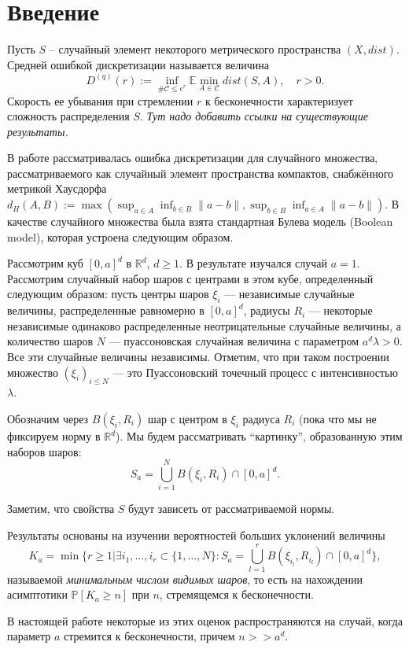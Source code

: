 \documentclass[12pt]{article}
\theoremstyle{plain}
\theoremstyle{definition}
\theoremstyle{remark}
\def\geq{\geqslant}
\def\leq{\leqslant}
\newcommand{\cuplim}{\bigcup\limits}
\newcommand{\R}{\mathbb{R}}
\newcommand{\PP}{\mathbb{P}}
\newcommand{\E}{\mathbb{E}}
\begin{document}
\section{Введение}

Пусть $S$  --  случайный элемент некоторого метрического пространства $(X, dist)$.
Средней ошибкой дискретизации называется величина $$D^{(q)}(r) := \inf\limits_{\#\mathcal{C}\leq e^r}\E \min\limits_{A\in\mathcal{C}}dist(S, A), \quad r>0.$$
Скорость ее убывания при  стремлении $r$ к бесконечности характеризует сложность распределения $S$.
{\it Тут надо добавить ссылки на существующие результаты.}

В работе \cite{AL} рассматривалась ошибка дискретизации для случайного множества,
рассматриваемого как случайный элемент пространства компактов, снабжённого метрикой Хаусдорфа $d_H(A, B) := \max(\sup_{a\in A}\inf_{b\in B}\|a - b\|, \sup_{b\in B}\inf_{a\in A}\|a - b\|)$.
В качестве случайного множества была взята стандартная Булева модель (Boolean model), которая
устроена следующим образом.

Рассмотрим куб $[0,a]^d$ в $\R^d$, $d \geq 1$. В результате \cite{AL} изучался случай $a=1$. Рассмотрим  случайный набор шаров с центрами в этом кубе, определенный следующим образом: пусть  центры шаров $\xi_i$ --- независимые случайные величины, распределенные равномерно в $[0,a]^d$, радиусы $R_i$ --- некоторые независимые одинаково распределенные неотрицательные случайные величины, а количество шаров $N$ --- пуассоновская случайная величина с параметром $a^d\lambda > 0$. Все эти случайные величины независимы. Отметим, что при таком построении множество $(\xi_i)_{i\leq N}$ --- это Пуассоновский точечный процесс с интенсивностью $\lambda$.

Обозначим через $B(\xi_i, R_i)$ шар с центром в $\xi_i$ радиуса $R_i$ (пока что мы не фиксируем норму в $\R^d$).
Мы будем рассматривать  ``картинку'', образованную этим наборов шаров:
$$S_a = \cuplim_{i=1}^N B(\xi_i, R_i) \cap [0,a]^d.$$

Заметим, что свойства $S$ будут зависеть от рассматриваемой нормы.

Результаты  \cite{AL}  основаны на изучении вероятностей  больших уклонений величины  $$K_a = \min \{r \geq 1 | \exists i_1, \ldots , i_r \subset \{1, \ldots , N\} : S_a = \cuplim_{l=1}^r B(\xi_{i_l}, R_{i_l}) \cap [0,a]^d\},$$
называемой {\it минимальным числом видимых шаров}, то есть на нахождении асимптотики $\PP[K_a \geq n]$ при $n$, стремящемся к бесконечности. 

В настоящей работе некоторые из этих оценок распространяются на случай, когда параметр $a$ стремится к бесконечности, причем $n >> a^d$.
\end{document}
